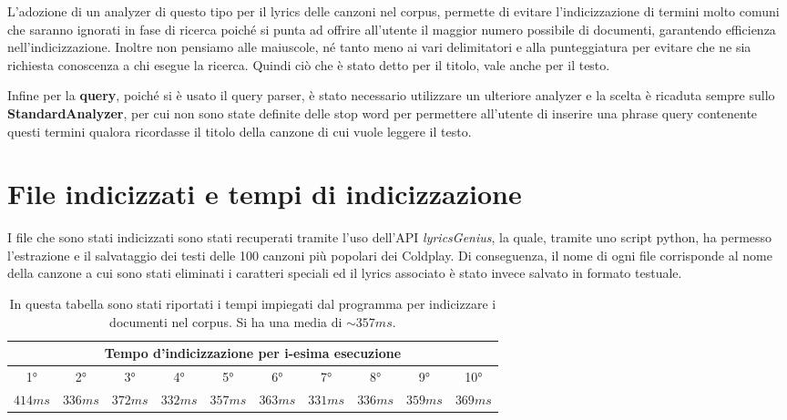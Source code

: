 \documentclass{article}
\begin{document}
L'adozione di un analyzer di questo tipo per il lyrics delle canzoni nel corpus, permette di evitare l'indicizzazione di termini molto comuni che saranno ignorati in fase di ricerca poiché si punta ad offrire all'utente il maggior numero possibile di documenti, garantendo efficienza nell'indicizzazione. Inoltre non pensiamo alle maiuscole, né tanto meno ai vari delimitatori e alla punteggiatura per evitare che ne sia richiesta conoscenza a chi esegue la ricerca. Quindi ciò che è stato detto per il titolo, vale anche per il testo.

Infine per la \textbf{query}, poiché si è usato il query parser, è stato necessario utilizzare un ulteriore analyzer e la scelta è ricaduta sempre sullo \textbf{StandardAnalyzer}, per cui non sono state definite delle stop word per permettere all'utente di inserire una phrase query contenente questi termini qualora ricordasse il titolo della canzone di cui vuole leggere il testo.

\section{File indicizzati e tempi di indicizzazione}
I file che sono stati indicizzati sono stati recuperati tramite l'uso dell'API \textit{lyricsGenius}, la quale, tramite uno script python, ha permesso l'estrazione e il salvataggio dei testi delle 100 canzoni più popolari dei Coldplay. Di conseguenza, il nome di ogni file corrisponde al nome della canzone a cui sono stati eliminati i caratteri speciali ed il lyrics associato è stato invece salvato in formato testuale.
\begingroup
\setlength{\tabcolsep}{5pt} %
\renewcommand{\arraystretch}{1.5} %
\begin{center}
\begin{table}[h!]
    \begin{tabular}{|c|c|c|c|c|c|c|c|c|c|}
    \hline
    \multicolumn{10}{|c|}{Tempo d'indicizzazione per i-esima esecuzione}\\
    \hline
    1° & 2° & 3° & 4° & 5° & 6° & 7° & 8° & 9° & 10° \\
    \hline
        $414ms$ & $336ms$ & $372ms$ & $332ms$ & $357ms$ & $363ms$ & $331ms$ & $336ms$ & $359ms$ & $369ms$ \\
    \hline
    \end{tabular}
    \caption{In questa tabella sono stati riportati i tempi impiegati dal programma per indicizzare i documenti nel corpus. Si ha una media di $\sim{357ms}$.}
    \label{tab:my_label}
\end{table}
\end{center}
\endgroup
\end{document}
